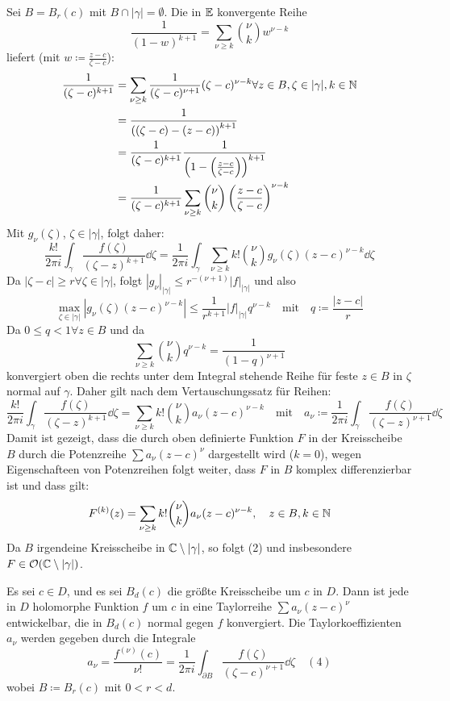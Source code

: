 \newpage
\begin{beweis}
	Sei $ B=B_r(c) $ mit $ B\cap|\gamma|=\emptyset $. Die in $ \mathbb{E} $ konvergente Reihe
	\[ \frac{1}{(1-w)^{k+1}}=\sum_{\nu\geq k}^{}\binom{\nu}{k}w^{\nu-k} \]
	liefert (mit $ w\coloneqq\frac{z-c}{\zeta-c} $):
	\begin{align*} \frac{1}{(\zeta-c)^{k+1}}&=\sum_{\nu\geq k}\frac{1}{(\zeta-c)^{\nu+1}}(\zeta-c)^{\nu-k}\forall z\in B,\zeta\in|\gamma|,k\in\mathbb{N}\\
	&=\frac{1}{\left((\zeta-c)-(z-c)\right)^{k+1}}\\
	&=\frac{1}{(\zeta-c)^{k+1}}\frac{1}{\left(1-\left(\frac{z-c}{\zeta-c}\right)\right)^{k+1}}\\
	&=\frac{1}{(\zeta-c)^{k+1}}\sum_{\nu\geq k}^{}\binom{\nu}{k}\left(\frac{z-c}{\zeta-c}\right)^{\nu-k} \end{align*}
	Mit $ g_\nu(\zeta) $, $ \zeta\in|\gamma| $, folgt daher:
	\[ \frac{k!}{2\pi i}\int_{\gamma}^{}\frac{f(\zeta)}{(\zeta-z)^{k+1}}\dd\zeta=\frac{1}{2\pi i}\int_{\gamma}^{}\sum_{\nu\geq k}^{}k!\binom{\nu}{k}g_\nu(\zeta)(z-c)^{\nu-k}\dd\zeta \]
	Da $ |\zeta-c|\geq r\forall\zeta\in|\gamma| $, folgt $ |g_\nu|_{|\gamma|}\leq r^{-(\nu+1)}|f|_{|\gamma|} $ und also
	\[ \max_{\zeta\in|\gamma|}|g_\nu(\zeta)(z-c)^{\nu-k}|\leq\frac{1}{r^{k+1}}|f|_{|\gamma|}q^{\nu-k}\quad\text{mit} \quad q\coloneqq\frac{|z-c|}{r}\]
	Da $ 0\leq q<1\forall z\in B $ und da
	\[ \sum_{\nu\geq k}^{}\binom{\nu}{k}q^{\nu-k}=\frac{1}{(1-q)^{\nu+1}} \]
	konvergiert oben die rechts unter dem Integral stehende Reihe f\"ur feste $ z\in B $ in $ \zeta $ normal auf $ \gamma $. Daher gilt nach dem Vertauschungssatz f\"ur Reihen:
	\[ \frac{k!}{2\pi i}\int_{\gamma}^{}\frac{f(\zeta)}{(\zeta-z)^{k+1}}\dd\zeta=\sum_{\nu\geq k}^{}k!\binom{\nu}{k}a_\nu(z-c)^{\nu-k}\quad\text{mit}\quad a_\nu\coloneqq\frac{1}{2\pi i}\int_{\gamma}^{}\frac{f(\zeta)}{(\zeta-z)^{\nu+1}}\dd\zeta \]
	Damit ist gezeigt, dass die durch oben definierte Funktion $ F $ in der Kreisscheibe $ B $ durch die Potenzreihe $ \sum a_\nu(z-c)^\nu $ dargestellt wird ($ k=0 $), wegen Eigenschafteen von Potenzreihen folgt weiter, dass $ F $ in $ B $ komplex differenzierbar ist und dass gilt:
	\[ F^{(k)}(z)=\sum_{\nu\geq k}^{}k!\binom{\nu}{k}a_\nu(z-c)^{\nu-k},\quad z\in B,k\in\mathbb{N} \]
	Da $ B $ irgendeine Kreisscheibe in $ \mathbb{C}\setminus|\gamma| $, so folgt (2)  und insbesondere $ F\in\mathcal O(\mathbb{C}\setminus|\gamma|) $.
\end{beweis}
\begin{satz}
	Es sei $ c\in D $, und es sei $ B_d(c) $ die gr\"o\ss te Kreisscheibe um $ c $ in $ D $. Dann ist jede in $ D $ holomorphe Funktion $ f $ um $ c $ in eine Taylorreihe $ \sum a_\nu(z-c)^\nu $ entwickelbar, die in $ B_d(c) $ normal gegen $ f $ konvergiert. Die Taylorkoeffizienten $ a_\nu $ werden gegeben durch die Integrale
	\[ a_\nu=\frac{f^{(\nu)}(c)}{\nu !}=\frac{1}{2\pi i}\int_{\partial B}\frac{f(\zeta)}{(\zeta-c)^{\nu+1}}\dd\zeta\quad(4) \]
	wobei $ B\coloneqq B_r(c) $ mit $ 0<r<d $. 
\end{satz}
